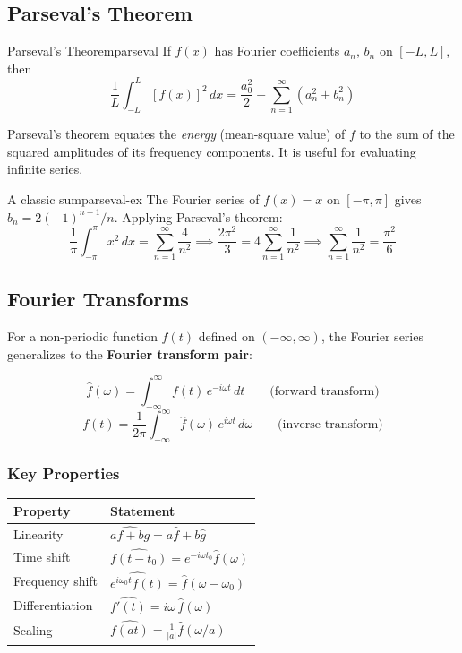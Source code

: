 \documentclass[11pt, letterpaper]{article}
\theoremstyle{plain}
\begin{document}
\subsection{Parseval's Theorem}

\begin{theorem}{Parseval's Theorem}{parseval}
    If $f(x)$ has Fourier coefficients $a_n$, $b_n$ on $[-L, L]$, then
    \[
        \frac{1}{L}\int_{-L}^{L} [f(x)]^2\,dx
        = \frac{a_0^2}{2} + \sum_{n=1}^{\infty}(a_n^2 + b_n^2)
    \]
\end{theorem}
 
Parseval's theorem equates the \emph{energy} (mean-square value) of $f$
to the sum of the squared amplitudes of its frequency components. It is
useful for evaluating infinite series.
 
\begin{example}{A classic sum}{parseval-ex}
    The Fourier series of $f(x) = x$ on $[-\pi,\pi]$ gives $b_n = 2(-1)^{n+1}/n$.
    Applying Parseval's theorem:
    \[
        \frac{1}{\pi}\int_{-\pi}^{\pi} x^2\,dx = \sum_{n=1}^{\infty}\frac{4}{n^2}
        \implies \frac{2\pi^2}{3} = 4\sum_{n=1}^{\infty}\frac{1}{n^2}
        \implies \sum_{n=1}^{\infty}\frac{1}{n^2} = \frac{\pi^2}{6}
    \]
\end{example}


\subsection{Fourier Transforms}
 
For a non-periodic function $f(t)$ defined on $(-\infty, \infty)$, the
Fourier series generalizes to the \textbf{Fourier transform pair}:
 
\[
    \hat{f}(\omega) = \int_{-\infty}^{\infty} f(t)\,e^{-i\omega t}\,dt
    \qquad \text{(forward transform)}
\]
\[
    f(t) = \frac{1}{2\pi}\int_{-\infty}^{\infty}
    \hat{f}(\omega)\,e^{i\omega t}\,d\omega
    \qquad \text{(inverse transform)}
\]
 
\subsubsection*{Key Properties}
 
\begin{center}
\begin{tabular}{ll}
    \toprule
    Property & Statement \\
    \midrule
    Linearity      & $\widehat{af + bg} = a\hat{f} + b\hat{g}$ \\[4pt]
    Time shift     & $\widehat{f(t-t_0)} = e^{-i\omega t_0}\hat{f}(\omega)$ \\[4pt]
    Frequency shift & $\widehat{e^{i\omega_0 t}f(t)} = \hat{f}(\omega - \omega_0)$ \\[4pt]
    Differentiation & $\widehat{f'(t)} = i\omega\,\hat{f}(\omega)$ \\[4pt]
    Scaling        & $\widehat{f(at)} = \tfrac{1}{|a|}\hat{f}(\omega/a)$ \\
    \bottomrule
\end{tabular}
\end{center}
 
\end{document}
